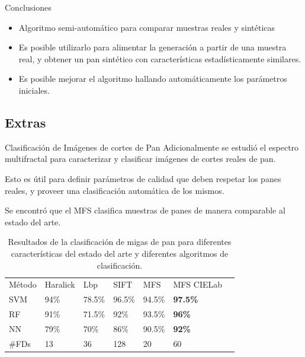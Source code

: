 \documentclass[spanish,unknownkeysallowed]{beamer}
\begin{document}
\begin{frame}{Conclusiones}
\begin{block}{}
\begin{itemize}
\item Algoritmo semi-automático para comparar muestras reales y sintéticas
\item Es posible utilizarlo para alimentar la generación a partir de una muestra real, y obtener un pan sintético con características estadísticamente similares.
\item Es posible mejorar el algoritmo hallando automáticamente los parámetros iniciales.
\end{itemize}
\end{block}

\end{frame}

\subsection{Extras}

\begin{frame}{Clasificación de Imágenes de cortes de Pan}
Adicionalmente se estudió el espectro multifractal para caracterizar y clasificar imágenes de cortes reales de pan.

Esto es útil para definir parámetros de calidad que deben respetar los panes reales, y proveer una clasificación automática de los mismos.

Se encontró que el MFS clasifica muestras de panes de manera comparable al estado del arte.

\end{frame}

\begin{frame}
\begin{table}[h!]
\center
\begin{tabular}{lllllll}
\hline\noalign{\smallskip}
Método & Haralick & Lbp & SIFT & MFS & MFS CIELab\\ %
\noalign{\smallskip}\hline\noalign{\smallskip}
SVM & 94\% & 78.5\% & 96.5\% & 94.5\% & \textbf{97.5\%} \\
RF  & 91\% & 71.5\% & 92\% & 93.5\% & \textbf{96\%} \\
NN & 79\% & 70\% & 86\%  & 90.5\% & \textbf{92\%} \\
\noalign{\smallskip}\hline
\#FDs & 13 & 36 & 128 & 20 & 60\\
\hline
\end{tabular}
\caption{Resultados de la clasificación de migas de pan para diferentes características del estado del arte y diferentes algoritmos de clasificación.}
\label{tab:other} 
\end{table}
\end{frame}
\end{document}
